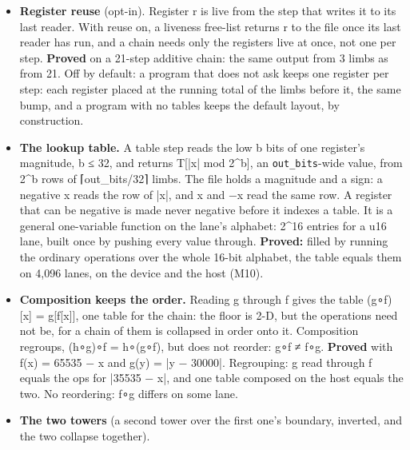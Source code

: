 \begin{itemize}
\begin{itemize}
\begin{itemize}
\item Every output bit is rebuilt from the raw fields one bit at a time, and each sign still holds 64 bits past its written width. This holds on 4,096 lanes in the 64-limb file and 512 in the 256-limb file.
\item Hand-worked answers match.
\item The narrowed widths are exactly the rule's: 32, 20, 20, 32, 41, 41, 32 and 32 over unsigned 32- and 20-bit fields and a signed 40-bit field. All 4,096 lanes equal the oracle past every narrowed width.
\item A wrap below 4 bits is refused at imprint (\texttt{test/\allowbreak{}engine/\allowbreak{}compiler/\allowbreak{}cycle/\allowbreak{}record\_\allowbreak{}bitwise\_\allowbreak{}test}, 24 checks, 0 failed).
\end{itemize}
\end{itemize}
\item \textbf{Register reuse} (opt-in). Register r is live from the step that writes it to its last reader. With reuse on, a liveness free-list returns r to the file once its last reader has run, and a chain needs only the registers live at once, not one per step. \textbf{Proved} on a 21-step additive chain: the same output from 3 limbs as from 21. Off by default: a program that does not ask keeps one register per step: each register placed at the running total of the limbs before it, the same bump, and a program with no tables keeps the default layout, by construction.
\item \textbf{The lookup table.} A table step reads the low b bits of one register's magnitude, b ≤ 32, and returns T[|x| mod 2\textasciicircum{}b], an \texttt{out\_\allowbreak{}bits}-wide value, from 2\textasciicircum{}b rows of ⌈out\_\allowbreak{}bits/32⌉ limbs. The file holds a magnitude and a sign: a negative x reads the row of |x|, and x and −x read the same row. A register that can be negative is made never negative before it indexes a table. It is a general one-variable function on the lane's alphabet: 2\textasciicircum{}16 entries for a u16 lane, built once by pushing every value through. \textbf{Proved:} filled by running the ordinary operations over the whole 16-bit alphabet, the table equals them on 4,096 lanes, on the device and the host (M10).
\item \textbf{Composition keeps the order.} Reading g through f gives the table (g∘f)[x] = g[f[x]], one table for the chain: the floor is 2-D, but the operations need not be, for a chain of them is collapsed in order onto it. Composition regroups, (h∘g)∘f = h∘(g∘f), but does not reorder: g∘f ≠ f∘g. \textbf{Proved} with f(x) = 65535 − x and g(y) = |y − 30000|. Regrouping: g read through f equals the ops for |35535 − x|, and one table composed on the host equals the two. No reordering: f∘g differs on some lane.
\item \textbf{The two towers} (a second tower over the first one's boundary, inverted, and the two collapse together).


\end{itemize}

